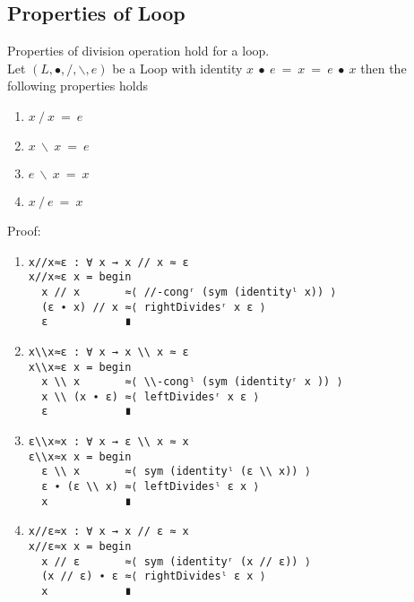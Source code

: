 \subsection{Properties of Loop}
Properties of division operation hold for a loop.\\
Let $(L, ∙, /, \backslash, e)$ be a Loop with identity $x\ ∙\ e\ =\ x\ =\ e\ ∙\ x$
then the following properties holds 
\begin{enumerate}
\item \(x \ /\  x\ =\ e\) 
\item \( x\ \backslash \ x\ =\ e\)
\item \(e\ \backslash \ x\ =\ x\) 
\item \(x\ /\ e\ =\ x\) 
\end{enumerate}
Proof:
\begin{enumerate}
\item 
\begin{verbatim}
x//x≈ε : ∀ x → x // x ≈ ε
x//x≈ε x = begin
  x // x       ≈⟨ //-congʳ (sym (identityˡ x)) ⟩
  (ε ∙ x) // x ≈⟨ rightDividesʳ x ε ⟩
  ε            ∎
\end{verbatim}
\item
\begin{verbatim}
x\\x≈ε : ∀ x → x \\ x ≈ ε
x\\x≈ε x = begin
  x \\ x       ≈⟨ \\-congˡ (sym (identityʳ x )) ⟩
  x \\ (x ∙ ε) ≈⟨ leftDividesʳ x ε ⟩
  ε            ∎
\end{verbatim}
\item
\begin{verbatim}
ε\\x≈x : ∀ x → ε \\ x ≈ x
ε\\x≈x x = begin
  ε \\ x       ≈⟨ sym (identityˡ (ε \\ x)) ⟩
  ε ∙ (ε \\ x) ≈⟨ leftDividesˡ ε x ⟩
  x            ∎
\end{verbatim}
\item
\begin{verbatim}
x//ε≈x : ∀ x → x // ε ≈ x
x//ε≈x x = begin
  x // ε       ≈⟨ sym (identityʳ (x // ε)) ⟩
  (x // ε) ∙ ε ≈⟨ rightDividesˡ ε x ⟩
  x            ∎
\end{verbatim}
\end{enumerate}
